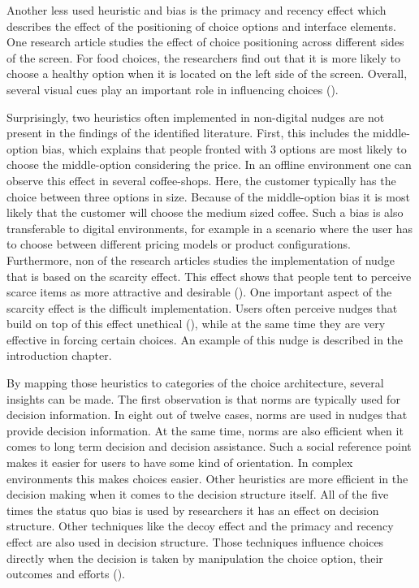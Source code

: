 Another less used heuristic and bias is the primacy and recency effect which describes the effect of the positioning of choice options and interface elements. One research article studies the effect of choice positioning across different sides of the screen. For food choices, the researchers find out that it is more likely to choose a healthy option when it is located on the left side of the screen. Overall, several visual cues play an important role in influencing choices (\cite{romero_healthy-left_2016}).

Surprisingly, two heuristics often implemented in non-digital nudges are not present in the findings of the identified literature. First, this includes the middle-option bias, which explains that people fronted with 3 options are most likely to choose the middle-option considering the price. In an offline environment one can observe this effect in several coffee-shops. Here, the customer typically has the choice between three options in size. Because of the middle-option bias it is most likely that the customer will choose the medium sized coffee. Such a bias is also transferable to digital environments, for example in a scenario where the user has to choose between different pricing models or product configurations. 
Furthermore, non of the research articles studies the implementation of nudge that is based on the scarcity effect. This effect shows that people tent to perceive scarce items as more attractive and desirable (\cite{gergen_search_1980}). One important aspect of the scarcity effect is the difficult implementation. Users often perceive nudges that build on top of this effect unethical (\cite{sunstein_nudging_2015}), while at the same time they are very effective in forcing certain choices. An example of this nudge is described in the introduction chapter.

By mapping those heuristics to categories of the choice architecture, several insights can be made. The first observation is that norms are typically used for decision information. In eight out of twelve cases, norms are used in nudges that provide decision information. At the same time, norms are also efficient when it comes to long term decision and decision assistance. Such a social reference point makes it easier for users to have some kind of orientation. In complex environments this makes choices easier. 
Other heuristics are more efficient in the decision making when it comes to the decision structure itself. All of the five times the status quo bias is used by researchers it has an effect on decision structure.
Other techniques like the decoy effect and the primacy and recency effect are also used in decision structure. Those techniques influence choices directly when the decision is taken by manipulation the choice option, their outcomes and efforts (\cite{munscher_review_2016}).


